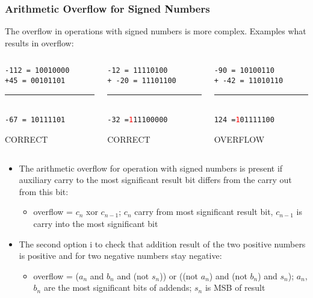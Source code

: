 \documentclass{beamer}
\begin{document}
\begin{frame}
\frametitle{Arithmetic Overflow for Signed Numbers}

The overflow in operations with signed numbers is more complex. Examples what results in overflow:
\bigskip
\begin{columns}
\begin{column}{0.3\textwidth}
\texttt{-112 = 10010000}\\
\texttt{+\phantom{x}45 = 00101101}\\
\vspace{-8pt}
\rule[0pt]{3cm}{0.1pt}\\
\texttt{\phantom{x}-67 = 10111101}\\
\begin{center}
\large CORRECT
\end{center}
\end{column}
\hfill
\begin{column}{0.3\textwidth}
\texttt{\phantom{xx}-12 = 11110100}\\
\texttt{+ -20 = 11101100}\\
\vspace{-8pt}
\rule[0pt]{3cm}{0.1pt}\\
\texttt{\phantom{xx}-32 =\textcolor{red}{1}11100000}\\
\begin{center}
\large CORRECT
\end{center}
\end{column}
\hfill
\begin{column}{0.3\textwidth}
\texttt{\phantom{xx}-90 = 10100110}\\
\texttt{+ -42 = 11010110}\\
\vspace{-8pt}
\rule[0pt]{3cm}{0.1pt}\\
\texttt{\phantom{xx}124 =\textcolor{red}{1}01111100}\\
\begin{center}
\large OVERFLOW
\end{center}
\end{column}
\end{columns}
\bigskip
\begin{itemize}
\item The arithmetic overflow for operation with signed numbers is present if auxiliary carry to the most significant result bit differs from the carry out from this bit:
\begin{itemize}
\item overflow = $c_n$ xor $c_{n-1}$; $c_n$ carry from most significant result bit, $c_{n-1}$ is carry into the most significant bit
\end{itemize}
\item The second option i to check that addition result of the two positive numbers is positive and for two negative numbers stay negative:
\begin{itemize}
\item overflow = ($a_n$ and  $b_n$ and (not $s_n$)) or ((not $a_n$) and  (not $b_n$) and $s_n$); $a_n$, $b_n$ are the most significant bits of addends; $s_n$ is MSB of result
\end{itemize}
\end{itemize}
\end{frame}
\end{document}
